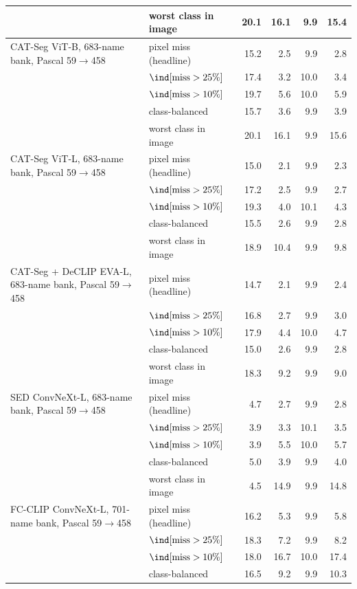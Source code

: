 \begin{tabular}{@{}llrrrr@{}}
 & worst class in image & 20.1 & 16.1 & 9.9 & 15.4 \\
\midrule
CAT-Seg ViT-B, 683-name bank, Pascal 59$\to$458 & pixel miss (headline) & 15.2 & 2.5 & 9.9 & 2.8 \\
 & $\ind[\text{miss} > 25\%]$ & 17.4 & 3.2 & 10.0 & 3.4 \\
 & $\ind[\text{miss} > 10\%]$ & 19.7 & 5.6 & 10.0 & 5.9 \\
 & class-balanced & 15.7 & 3.6 & 9.9 & 3.9 \\
 & worst class in image & 20.1 & 16.1 & 9.9 & 15.6 \\
\midrule
CAT-Seg ViT-L, 683-name bank, Pascal 59$\to$458 & pixel miss (headline) & 15.0 & 2.1 & 9.9 & 2.3 \\
 & $\ind[\text{miss} > 25\%]$ & 17.2 & 2.5 & 9.9 & 2.7 \\
 & $\ind[\text{miss} > 10\%]$ & 19.3 & 4.0 & 10.1 & 4.3 \\
 & class-balanced & 15.5 & 2.6 & 9.9 & 2.8 \\
 & worst class in image & 18.9 & 10.4 & 9.9 & 9.8 \\
\midrule
CAT-Seg + DeCLIP EVA-L, 683-name bank, Pascal 59$\to$458 & pixel miss (headline) & 14.7 & 2.1 & 9.9 & 2.4 \\
 & $\ind[\text{miss} > 25\%]$ & 16.8 & 2.7 & 9.9 & 3.0 \\
 & $\ind[\text{miss} > 10\%]$ & 17.9 & 4.4 & 10.0 & 4.7 \\
 & class-balanced & 15.0 & 2.6 & 9.9 & 2.8 \\
 & worst class in image & 18.3 & 9.2 & 9.9 & 9.0 \\
\midrule
SED ConvNeXt-L, 683-name bank, Pascal 59$\to$458 & pixel miss (headline) & 4.7 & 2.7 & 9.9 & 2.8 \\
 & $\ind[\text{miss} > 25\%]$ & 3.9 & 3.3 & 10.1 & 3.5 \\
 & $\ind[\text{miss} > 10\%]$ & 3.9 & 5.5 & 10.0 & 5.7 \\
 & class-balanced & 5.0 & 3.9 & 9.9 & 4.0 \\
 & worst class in image & 4.5 & 14.9 & 9.9 & 14.8 \\
\midrule
FC-CLIP ConvNeXt-L, 701-name bank, Pascal 59$\to$458 & pixel miss (headline) & 16.2 & 5.3 & 9.9 & 5.8 \\
 & $\ind[\text{miss} > 25\%]$ & 18.3 & 7.2 & 9.9 & 8.2 \\
 & $\ind[\text{miss} > 10\%]$ & 18.0 & 16.7 & 10.0 & 17.4 \\
 & class-balanced & 16.5 & 9.2 & 9.9 & 10.3 \\

\end{tabular}
